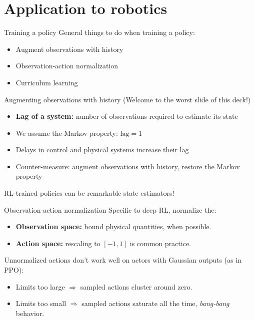 \documentclass[10pt, aspectratio=1610]{beamer}
\begin{document}
\section{Application to robotics}

\begin{frame}{Training a policy}
    General things to do when training a policy:
    \begin{itemize}
        \item Augment observations with history
        \item Observation-action normalization
        \item Curriculum learning
    \end{itemize}
\end{frame}

\begin{frame}{Augmenting observations with history}
    (Welcome to the worst slide of this deck!)
    \begin{itemize}
        \item \textbf{Lag of a system:} number of observations required to estimate its state
        \item We assume the Markov property: $\mathrm{lag} = 1$
        \item Delays in control and physical systems increase their lag
        \item Counter-measure: augment observations with history, restore the Markov property
    \end{itemize}
    RL-trained policies can be remarkable state estimators!
\end{frame}

\begin{frame}{Observation-action normalization}
    Specific to deep RL, normalize the:
    \begin{itemize}
        \item \textbf{Observation space:} bound physical quantities, when possible.
        \item \textbf{Action space:} rescaling to $[-1, 1]$ is common practice.
    \end{itemize}
    Unnormalized actions don't work well on actors with Gaussian outputs (as in PPO):
    \begin{itemize}
        \item Limits too large $\Rightarrow$ sampled actions cluster around zero.
        \item Limits too small $\Rightarrow$ sampled actions saturate all the time, \emph{bang-bang} behavior.
    \end{itemize}
\end{frame}
\end{document}
